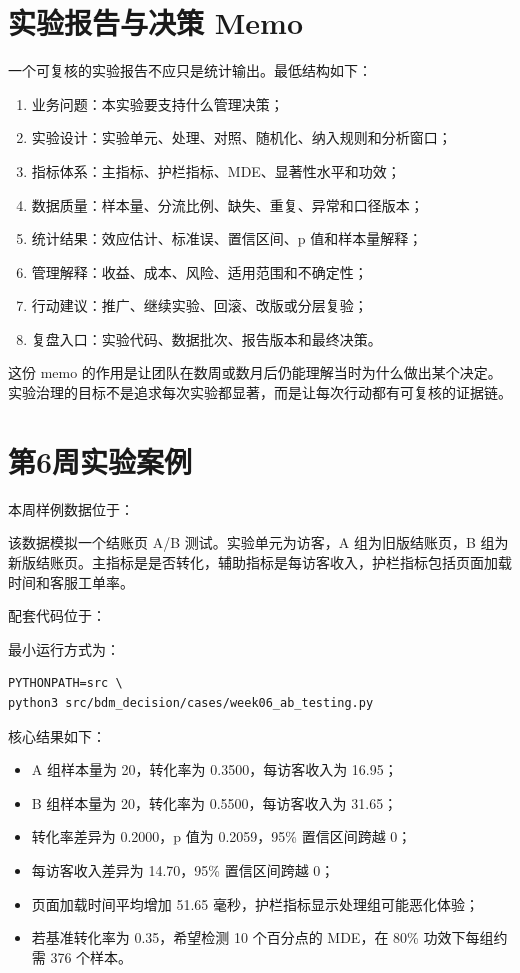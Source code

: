 \documentclass[UTF8,fontset=fandol,openany,zihao=-4]{ctexbook}
\begin{document}
\section{实验报告与决策 Memo}

一个可复核的实验报告不应只是统计输出。最低结构如下：
\begin{enumerate}
  \item 业务问题：本实验要支持什么管理决策；
  \item 实验设计：实验单元、处理、对照、随机化、纳入规则和分析窗口；
  \item 指标体系：主指标、护栏指标、MDE、显著性水平和功效；
  \item 数据质量：样本量、分流比例、缺失、重复、异常和口径版本；
  \item 统计结果：效应估计、标准误、置信区间、p 值和样本量解释；
  \item 管理解释：收益、成本、风险、适用范围和不确定性；
  \item 行动建议：推广、继续实验、回滚、改版或分层复验；
  \item 复盘入口：实验代码、数据批次、报告版本和最终决策。
\end{enumerate}

这份 memo 的作用是让团队在数周或数月后仍能理解当时为什么做出某个决定。实验治理的目标不是追求每次实验都显著，而是让每次行动都有可复核的证据链。

\section{第6周实验案例}

本周样例数据位于：
\begin{center}
\end{center}
该数据模拟一个结账页 A/B 测试。实验单元为访客，A 组为旧版结账页，B 组为新版结账页。主指标是是否转化，辅助指标是每访客收入，护栏指标包括页面加载时间和客服工单率。

配套代码位于：
\begin{center}
\end{center}

最小运行方式为：
\begin{lstlisting}[style=pythonstyle,caption={运行第6周 A/B 测试案例}]
PYTHONPATH=src \
python3 src/bdm_decision/cases/week06_ab_testing.py
\end{lstlisting}

核心结果如下：
\begin{itemize}
  \item A 组样本量为 20，转化率为 0.3500，每访客收入为 16.95；
  \item B 组样本量为 20，转化率为 0.5500，每访客收入为 31.65；
  \item 转化率差异为 0.2000，p 值为 0.2059，95\% 置信区间跨越 0；
  \item 每访客收入差异为 14.70，95\% 置信区间跨越 0；
  \item 页面加载时间平均增加 51.65 毫秒，护栏指标显示处理组可能恶化体验；
  \item 若基准转化率为 0.35，希望检测 10 个百分点的 MDE，在 80\% 功效下每组约需 376 个样本。
\end{itemize}
\end{document}
